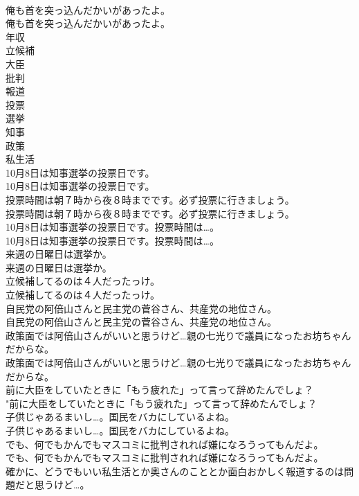 \documentclass[8pt]{extreport}
\begin{document}
\begin{CJK}{UTF8}{min}
\\	俺も首を突っ込んだかいがあったよ。	
\\	俺も首を突っ込んだかいがあったよ。 
\\	年収
\\	立候補
\\	大臣
\\	批判
\\	報道
\\	投票
\\	選挙
\\	知事
\\	政策
\\	私生活
\\	10月8日は知事選挙の投票日です。	
\\	10月8日は知事選挙の投票日です。 
\\	投票時間は朝７時から夜８時までです。必ず投票に行きましょう。	
\\	投票時間は朝７時から夜８時までです。必ず投票に行きましょう。 
\\	10月8日は知事選挙の投票日です。投票時間は…。	
\\	10月8日は知事選挙の投票日です。投票時間は…。 
\\	来週の日曜日は選挙か。	
\\	来週の日曜日は選挙か。 
\\	立候補してるのは４人だったっけ。	
\\	立候補してるのは４人だったっけ。 
\\	自民党の阿倍山さんと民主党の菅谷さん、共産党の地位さん。	
\\	自民党の阿倍山さんと民主党の菅谷さん、共産党の地位さん。 
\\	政策面では阿倍山さんがいいと思うけど…親の七光りで議員になったお坊ちゃんだからな。	
\\	政策面では阿倍山さんがいいと思うけど…親の七光りで議員になったお坊ちゃんだからな。 
\\	前に大臣をしていたときに「もう疲れた」って言って辞めたんでしょ？	
\\	"前に大臣をしていたときに「もう疲れた」って言って辞めたんでしょ？ 
\\	子供じゃあるまいし…。国民をバカにしているよね。	
\\	子供じゃあるまいし…。国民をバカにしているよね。 
\\	でも、何でもかんでもマスコミに批判されれば嫌になろうってもんだよ。	
\\	でも、何でもかんでもマスコミに批判されれば嫌になろうってもんだよ。 
\\	確かに、どうでもいい私生活とか奥さんのこととか面白おかしく報道するのは問題だと思うけど…。	

\end{CJK}
\end{document}
